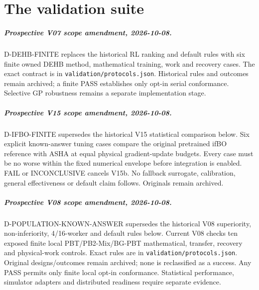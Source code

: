 \chapter{The validation suite}
\label{sec:validation}

\paragraph{Prospective V07 scope amendment, 2026-10-08.}
D-DEHB-FINITE replaces the historical RL ranking and default rules with six
finite owned DEHB method, mathematical training, work and recovery cases.
The exact contract is in \texttt{validation/protocols.json}. Historical rules
and outcomes remain archived; a finite PASS establishes only opt-in serial
conformance. Selective GP robustness remains a separate implementation stage.


\paragraph{Prospective V15 scope amendment, 2026-10-08.}
D-IFBO-FINITE supersedes the historical V15 statistical comparison below.
Six explicit known-answer tuning cases compare the original pretrained ifBO
reference with ASHA at equal physical gradient-update budgets. Every case must
be no worse within the fixed numerical envelope before integration is enabled.
FAIL or INCONCLUSIVE cancels V15b. No fallback surrogate, calibration, general
effectiveness or default claim follows. Originals remain archived.


\paragraph{Prospective V08 scope amendment, 2026-10-08.}
D-POPULATION-KNOWN-ANSWER supersedes the historical V08 superiority,
non-inferiority, 4/16-worker and default rules below. Current V08 checks ten
exposed finite local PBT/PB2-Mix/BG-PBT mathematical, transfer, recovery and
physical-work controls. Exact rules are in \texttt{validation/protocols.json}.
Original designs/outcomes remain archived; none is reclassified as a success.
Any PASS permits only finite local opt-in conformance. Statistical performance,
simulator adapters and distributed readiness require separate evidence.


